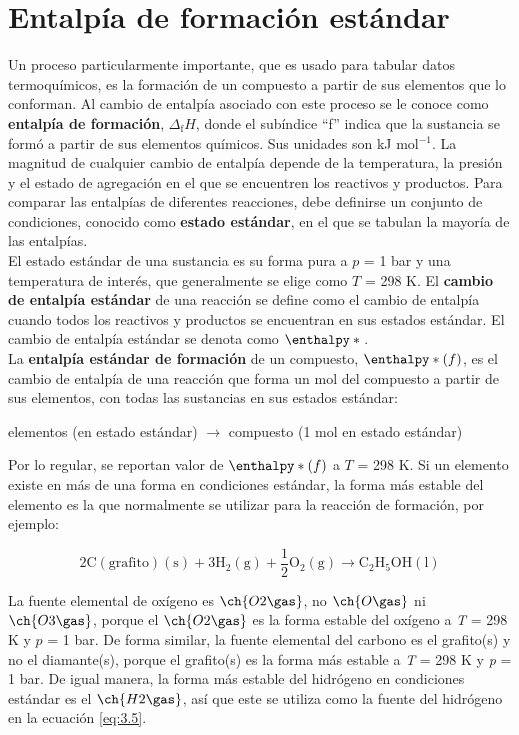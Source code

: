 \section{Entalpía de formación estándar}

Un proceso particularmente importante, que es usado para tabular datos termoquímicos, es la formación de un compuesto a partir de sus elementos que lo conforman. Al cambio de entalpía asociado con este proceso se le conoce como \textbf{entalpía de formación}, $\Delta_{\mathrm{f}}H$, donde el subíndice ``f'' indica que la sustancia se formó a partir de sus elementos químicos. Sus unidades son  kJ mol$^{-1}$. La magnitud de cualquier cambio de entalpía depende de la temperatura, la presión y el estado de agregación en el que se encuentren los reactivos y productos. Para comparar las entalpías de diferentes reacciones, debe definirse un conjunto de condiciones, conocido como \textbf{estado estándar}, en el que se tabulan la mayoría de las entalpías. \\El estado estándar de una sustancia es su forma pura a $p$ = 1 bar y una temperatura de interés, que generalmente se elige como $T$ = 298 K. El \textbf{cambio de entalpía estándar} de una reacción se define como el cambio de entalpía cuando todos los reactivos y productos se encuentran en sus estados estándar. El cambio de entalpía estándar se denota como $\enthalpy*{}$. \\
La \textbf{entalpía estándar de formación} de un compuesto, $\enthalpy*(f){}$, es el cambio de entalpía de una reacción que forma un mol del compuesto a partir de sus elementos, con todas las sustancias en sus estados estándar:

\begin{center}
elementos (en estado estándar) $\longrightarrow$ compuesto (1 mol en estado estándar)
\end{center}

Por lo regular, se reportan valor de $\enthalpy*(f){}$ a $T$ = 298 K. Si un elemento existe en más de una forma en condiciones estándar, la forma más estable del elemento es la que normalmente se utilizar para la reacción de formación, por ejemplo:

\begin{equation}
	2\mathrm{C(grafito){(s)}} + 3\mathrm{{H}_{2}(g)} + \frac{1}{2}\mathrm{{O}_{2}(g)} \longrightarrow \mathrm{C_{2}H_{5}OH}{\mathrm{(l)}}
\label{eq:3.5}
\end{equation}

La fuente elemental de oxígeno es $\ch{O2\gas}$, no $\ch{O\gas}$ ni $\ch{O3\gas}$, porque el $\ch{O2\gas}$ es la forma estable del oxígeno a \textit{T} = 298 K y $p$ = 1 bar. De forma similar, la fuente elemental del carbono es el grafito(s) y no el diamante(s), porque el grafito(s) es la forma más estable a \textit{T} = 298 K y \textit{p} = 1 bar. De igual manera, la forma más estable del hidrógeno en condiciones estándar es el $\ch{H2\gas}$, así que este se utiliza como la fuente del hidrógeno en la ecuación \ref{eq:3.5}.



